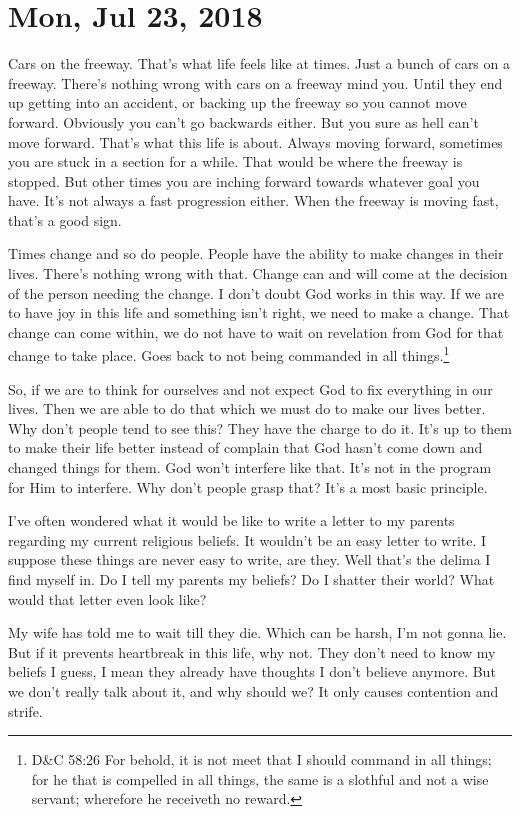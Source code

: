 \section{Mon, Jul 23, 2018}

Cars on the freeway. That's what life feels like at times. Just a bunch of cars on a
freeway. There's nothing wrong with cars on a freeway mind you. Until they end up
getting into an accident, or backing up the freeway so you cannot move forward.
Obviously you can't go backwards either. But you sure as hell can't move forward.
That's what this life is about. Always  moving forward, sometimes you are stuck in a
section for a while. That would be where the freeway is stopped. But other times you
are inching forward towards whatever goal you have. It's not always a fast
progression either. When the freeway is moving fast, that's a good sign.

Times change and so do people. People have the ability to make changes in their
lives. There's nothing wrong with that. Change can and will come at the decision of
the person needing the change. I don't doubt God works in this way. If we are to have
joy in this life and something isn't right, we need to make a change. That change can
come within, we do not have to wait on revelation from God for that change to take
place. Goes back to not being commanded in all things.\footnote{D\&C 58:26 For behold, 
it is not meet that I should command in all things; for he that is compelled in all 
things, the same is a slothful and not a wise servant; wherefore he receiveth no 
reward.}

So, if we are to think for ourselves and not expect God to fix everything in our
lives. Then we are able to do that which we must do to make our lives better. Why
don't people tend to see this? They have the charge to do it. It's up to them to make
their life better instead of complain that God hasn't come down and changed things
for them. God won't interfere like that. It's not in the program for Him to
interfere. Why don't people grasp that? It's a most basic principle.

I've often wondered what it would be like to write a letter to my parents regarding
my current religious beliefs. It wouldn't be an easy letter to write. I suppose these
things are never easy to write, are they. Well that's the delima I find myself in. Do
I tell my parents my beliefs? Do I shatter their world? What would that letter even
look like?

My wife has told me to wait till they die. Which can be harsh, I'm not gonna lie. But
if it prevents heartbreak in this life, why not. They don't need to know my beliefs I
guess, I mean they already have thoughts I don't believe anymore. But we don't really
talk about it, and why should we? It only causes contention and strife.